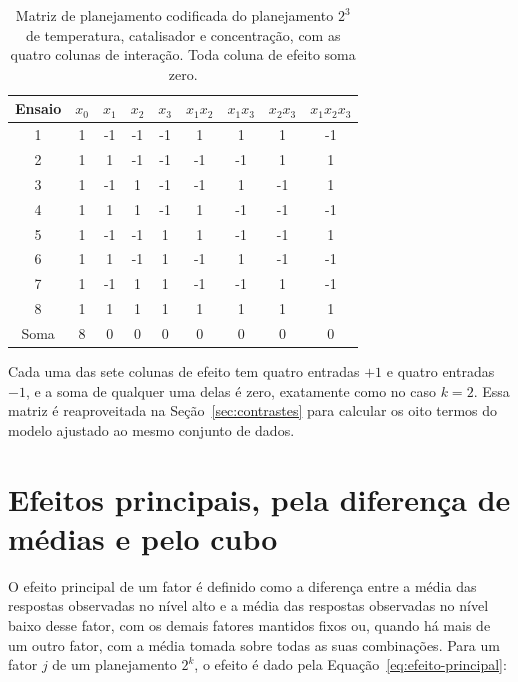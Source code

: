 \documentclass{doeapostila}
\begin{document}
\begin{table}[H]
  \centering
  \caption{Matriz de planejamento codificada do planejamento $2^{3}$ de
    temperatura, catalisador e concentração, com as quatro colunas de
    interação. Toda coluna de efeito soma zero.}
  \label{tab:matriz-2x3}
  {\footnotesize
  \begin{tabular}{c S[table-format=1.0] S[table-format=1.0] S[table-format=1.0]
                  S[table-format=1.0] S[table-format=1.0] S[table-format=1.0]
                  S[table-format=1.0] S[table-format=1.0]}
    \toprule
    {Ensaio} & {$x_{0}$} & {$x_{1}$} & {$x_{2}$} & {$x_{3}$}
      & {$x_{1}x_{2}$} & {$x_{1}x_{3}$} & {$x_{2}x_{3}$} & {$x_{1}x_{2}x_{3}$} \\
     & 1 & -1 & -1 & -1 & 1  & 1  & 1  & -1 \\
    2 & 1 & 1  & -1 & -1 & -1 & -1 & 1  & 1  \\
    3 & 1 & -1 & 1  & -1 & -1 & 1  & -1 & 1  \\
    4 & 1 & 1  & 1  & -1 & 1  & -1 & -1 & -1 \\
    5 & 1 & -1 & -1 & 1  & 1  & -1 & -1 & 1  \\
    6 & 1 & 1  & -1 & 1  & -1 & 1  & -1 & -1 \\
    7 & 1 & -1 & 1  & 1  & -1 & -1 & 1  & -1 \\
    8 & 1 & 1  & 1  & 1  & 1  & 1  & 1  & 1  \\
    \midrule
    {Soma} & {8} & {0} & {0} & {0} & {0} & {0} & {0} & {0} \\
    \bottomrule
  \end{tabular}}
\end{table}

Cada uma das sete colunas de efeito tem quatro entradas $+1$ e quatro
entradas $-1$, e a soma de qualquer uma delas é zero, exatamente como no caso
$k = 2$. Essa matriz é reaproveitada na Seção~\ref{sec:contrastes} para
calcular os oito termos do modelo ajustado ao mesmo conjunto de dados.

\section{Efeitos principais, pela diferença de médias e pelo cubo}
\label{sec:efeitos-principais}

O efeito principal de um fator é definido como a diferença entre a média das
respostas observadas no nível alto e a média das respostas observadas no
nível baixo desse fator, com os demais fatores mantidos fixos ou, quando há
mais de um outro fator, com a média tomada sobre todas as suas combinações.
Para um fator $j$ de um planejamento $2^{k}$, o efeito é dado pela
Equação~\eqref{eq:efeito-principal}:
\end{document}
